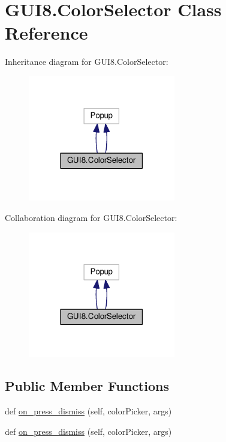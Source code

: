 \hypertarget{classGUI8_1_1ColorSelector}{}\section{G\+U\+I8.\+Color\+Selector Class Reference}
\label{classGUI8_1_1ColorSelector}


Inheritance diagram for G\+U\+I8.\+Color\+Selector\+:\nopagebreak
\begin{figure}[H]
\begin{center}
\leavevmode
\includegraphics[width=182pt]{classGUI8_1_1ColorSelector__inherit__graph}
\end{center}
\end{figure}


Collaboration diagram for G\+U\+I8.\+Color\+Selector\+:\nopagebreak
\begin{figure}[H]
\begin{center}
\leavevmode
\includegraphics[width=182pt]{classGUI8_1_1ColorSelector__coll__graph}
\end{center}
\end{figure}
\subsection*{Public Member Functions}
\begin{DoxyCompactItemize}
\item 
def \hyperlink{classGUI8_1_1ColorSelector_af1c3dc2b6ada3189e0d69d7a16c347a7}{on\+\_\+press\+\_\+dismiss} (self, color\+Picker, args)
\item 
def \hyperlink{classGUI8_1_1ColorSelector_af1c3dc2b6ada3189e0d69d7a16c347a7}{on\+\_\+press\+\_\+dismiss} (self, color\+Picker, args)
\end{DoxyCompactItemize}
